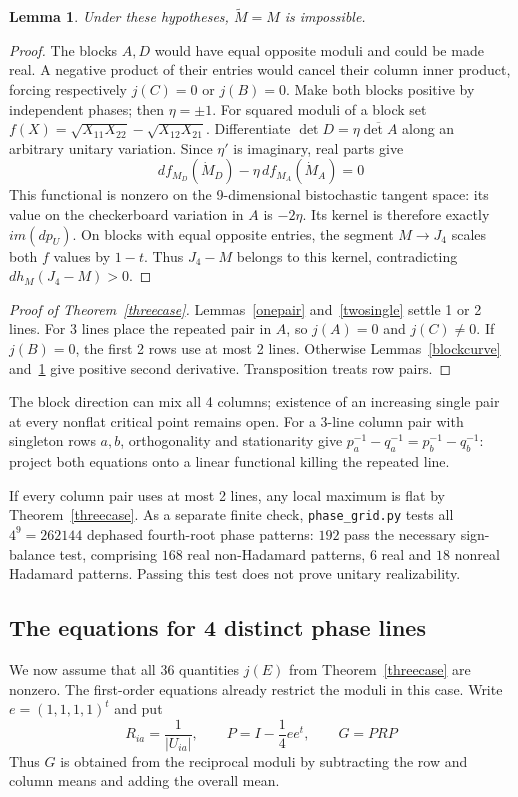 \documentclass[11pt,a4paper]{article}
\newtheorem{lem}[thm]{Lemma}
\begin{document}
\begin{lem}\label{blockequal}
Under these hypotheses, $\tilde M=M$ is impossible.
\end{lem}
\begin{proof}
The blocks $A,D$ would have equal opposite moduli and could be made
real. A negative product of their entries would cancel their column
inner product, forcing respectively $j(C)=0$ or $j(B)=0$.
Make both blocks positive by independent phases; then $\eta=\pm1$.
For squared moduli of a block set
$f(X)=\sqrt{X_{11}X_{22}}-\sqrt{X_{12}X_{21}}$.
Differentiate $\det D=\eta\overline{\det A}$ along an arbitrary
unitary variation. Since $\eta'$ is imaginary, real parts give
\[
 df_{M_D}(\dot M_D)-\eta\,df_{M_A}(\dot M_A)=0
\]
This functional is nonzero on the 9-dimensional bistochastic tangent
space: its value on the checkerboard variation in $A$ is $-2\eta$.
Its kernel is therefore exactly $im(dp_U)$.
On blocks with equal opposite entries, the segment $M\to J_4$ scales
both $f$ values by $1-t$. Thus $J_4-M$ belongs to this kernel,
contradicting $dh_M(J_4-M)>0$.
\end{proof}
\begin{proof}[Proof of Theorem~\ref{threecase}]
Lemmas~\ref{onepair} and~\ref{twosingle} settle 1 or 2 lines.
For 3 lines place the repeated pair in $A$, so $j(A)=0$ and
$j(C)\ne0$. If $j(B)=0$, the first 2 rows use at most 2 lines.
Otherwise Lemmas~\ref{blockcurve} and~\ref{blockequal} give positive
second derivative. Transposition treats row pairs.
\end{proof}

The block direction can mix all 4 columns; existence of an increasing
single pair at every nonflat critical point remains open. For a 3-line column pair with
singleton rows $a,b$, orthogonality and stationarity give
$p_a^{-1}-q_a^{-1}=p_b^{-1}-q_b^{-1}$: project both equations onto a
linear functional killing the repeated line.

If every column pair uses at most 2 lines, any local maximum is flat
by Theorem~\ref{threecase}. As a separate finite check,
\texttt{phase\_grid.py} tests all $4^9=262144$ dephased fourth-root
phase patterns: $192$ pass the necessary sign-balance test, comprising
$168$ real non-Hadamard patterns, $6$ real and $18$ nonreal Hadamard
patterns. Passing this test does not prove unitary realizability.

\subsection{The equations for 4 distinct phase lines}\label{fourlinessection}
We now assume that all $36$ quantities $j(E)$ from
Theorem~\ref{threecase} are nonzero. The first-order equations already
restrict the moduli in this case. Write $e=(1,1,1,1)^t$ and put
\[
 R_{ia}=\frac1{|U_{ia}|},\qquad P=I-\frac14ee^t,
 \qquad G=PRP
\]
Thus $G$ is obtained from the reciprocal moduli by subtracting the row
and column means and adding the overall mean.
\end{document}
